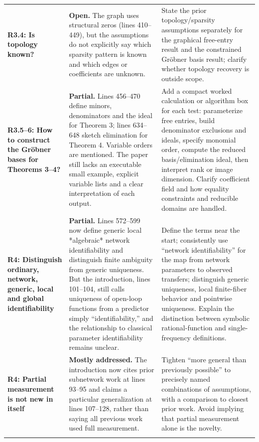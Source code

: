\documentclass[11pt,a4paper]{article}
\begin{document}
\begin{longtable}{@{}p{}p{}p{}@{}}
\textbf{R3.4: Is topology known?} & \textbf{Open.} The graph uses structural zeros (lines 410–449), but the assumptions do not explicitly say which sparsity pattern is known and which edges or coefficients are unknown. & State the prior topology/sparsity assumptions separately for the graphical free-entry result and the constrained Gröbner basis result; clarify whether topology recovery is outside scope.\\\addlinespace\midrule
\textbf{R3.5–6: How to construct the Gröbner bases for Theorems 3–4?} & \textbf{Partial.} Lines 456–470 define minors, denominators and the ideal for Theorem 3; lines 634–648 sketch elimination for Theorem 4. Variable orders are mentioned. The paper still lacks an executable small example, explicit variable lists and a clear interpretation of each output. & Add a compact worked calculation or algorithm box for each test: parameterize free entries, build denominator exclusions and ideals, specify monomial order, compute the reduced basis/elimination ideal, then interpret rank or image dimension. Clarify coefficient field and how equality constraints and reducible domains are handled.\\\addlinespace\midrule
\textbf{R4: Distinguish ordinary, network, generic, local and global identifiability} & \textbf{Partial.} Lines 572–599 now define generic local *algebraic* network identifiability and distinguish finite ambiguity from generic uniqueness. But the introduction, lines 101–104, still calls uniqueness of open-loop functions from a predictor simply “identifiability,” and the relationship to classical parameter identifiability remains unclear. & Define the terms near the start; consistently use “network identifiability” for the map from network parameters to observed transfers; distinguish generic uniqueness, local finite-fiber behavior and pointwise uniqueness. Explain the distinction between symbolic rational-function and single-frequency definitions.\\\addlinespace\midrule
\textbf{R4: Partial measurement is not new in itself} & \textbf{Mostly addressed.} The introduction now cites prior subnetwork work at lines 93–95 and claims a particular generalization at lines 107–128, rather than saying all previous work used full measurement. & Tighten “more general than previously possible” to precisely named combinations of assumptions, with a comparison to closest prior work. Avoid implying that partial measurement alone is the novelty.\\\addlinespace\midrule

\end{longtable}
\end{document}
